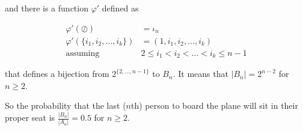 and there is a function $\varphi'$ defined as 

\begin{equation*}
    \begin{split}
        \varphi'(\oslash) & = \iota_n \\
        \varphi'(\{i_1, i_2,\ldots, i_k\}) & =  (1, i_1, i_2,\ldots, i_k) \\
             \text{assuming } & 2 \leq i_1 < i_2 < \ldots < i_k \leq n -1
    \end{split}
\end{equation*}

that defines a bijection from $2^{\{2,\ldots,n - 1\}}$ to $B_n$. It means that $|B_n| = 2^{n - 2}$ for $n \geq 2$.

So the probability that the last ($n$th) person to board the plane will sit in their proper seat is $\frac{|B_n|}{|A_n|} = 0.5$ for $n \geq 2$.



